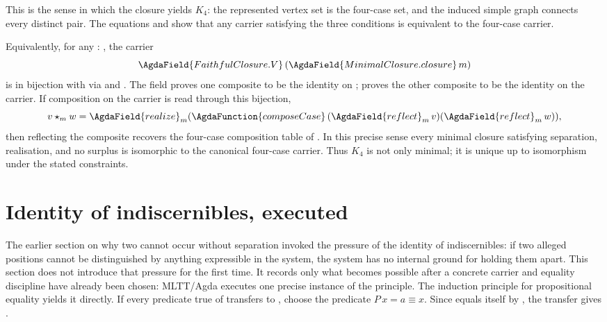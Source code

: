 \documentclass[11pt]{article}
\begin{document}
This is the sense in which the closure yields $K_4$: the represented
vertex set is the four-case set, and the induced simple graph connects every
distinct pair.  The equations  and
 show that any carrier satisfying the
three conditions is equivalent to the four-case carrier.

Equivalently, for any  : , the
carrier
\[
\AgdaField{FaithfulClosure.V}\,(\AgdaField{MinimalClosure.closure}\,m)
\]
is in bijection with  via 
and .  The field 
proves one composite to be the identity on ;
 proves the other composite to be the
identity on the carrier.  If composition on the carrier is read through
this bijection,
\[
v \star_m w =
\AgdaField{realize}_m
  (\AgdaFunction{composeCase}\,(\AgdaField{reflect}_m\,v)
                              (\AgdaField{reflect}_m\,w)),
\]
then reflecting the composite recovers the four-case composition table
of .  In this precise sense every minimal
closure satisfying separation, realisation, and no surplus is
isomorphic to the canonical four-case carrier.  Thus $K_4$ is not only
minimal; it is unique up to isomorphism under the stated constraints.

\section{Identity of indiscernibles, executed}

The earlier section on why two cannot occur without separation invoked
the pressure of the identity of indiscernibles: if two alleged positions cannot
be distinguished by anything expressible in the system, the system has
no internal ground for holding them apart.  This section does not
introduce that pressure for the first time.  It records only what
becomes possible after a
concrete carrier and equality discipline have already been chosen:
MLTT/Agda executes one precise instance of the principle.  The induction
principle for propositional equality yields it directly.  If every
predicate true of  transfers to , choose the
predicate \(P\,x = a \equiv x\).  Since  equals itself by
, the transfer gives 
\AgdaSymbol{\ensuremath{\equiv}} .
\end{document}
